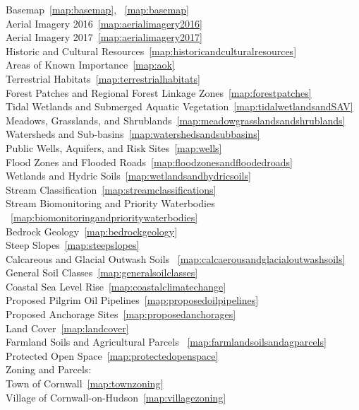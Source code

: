 Basemap\dotfill~\ref{map:basemap}, ~\ref{map:basemap}\\
Aerial Imagery 2016\dotfill~\ref{map:aerialimagery2016}\\
Aerial Imagery 2017\dotfill~\ref{map:aerialimagery2017}\\
Historic and Cultural Resources\dotfill~\ref{map:historicandculturalresources}\\
Areas of Known Importance\dotfill~\ref{map:aok}\\
Terrestrial Habitats\dotfill~\ref{map:terrestrialhabitats}\\
Forest Patches and Regional Forest Linkage Zones\dotfill~\ref{map:forestpatches} \\
Tidal Wetlands and Submerged Aquatic Vegetation\dotfill~\ref{map:tidalwetlandsandSAV}\\
Meadows, Grasslands, and Shrublands\dotfill~\ref{map:meadowgrasslandsandshrublands}\\
Watersheds and Sub-basins\dotfill~\ref{map:watershedsandsubbasins}\\
Public Wells, Aquifers, and Risk Sites\dotfill~\ref{map:wells}\\
Flood Zones and Flooded Roads\dotfill~\ref{map:floodzonesandfloodedroads}\\
Wetlands and Hydric Soils\dotfill~\ref{map:wetlandsandhydricsoils}\\
Stream Classification\dotfill~\ref{map:streamclassifications}\\
Stream Biomonitoring and Priority Waterbodies 
\dotfill~\ref{map:biomonitoringandprioritywaterbodies}\\
Bedrock Geology\dotfill~\ref{map:bedrockgeology}\\
Steep Slopes\dotfill~\ref{map:steepslopes}\\
Calcareous and Glacial Outwash Soils \dotfill ~\ref{map:calcaerousandglacialoutwashsoils}\\
General Soil Classes\dotfill~\ref{map:generalsoilclasses}\\
Coastal Sea Level Rise\dotfill~\ref{map:coastalclimatechange}\\
Proposed Pilgrim Oil Pipelines\dotfill~\ref{map:proposedoilpipelines}\\
Proposed Anchorage Sites\dotfill~\ref{map:proposedanchorages}\\
Land Cover\dotfill~\ref{map:landcover}\\
Farmland Soils and Agricultural Parcels \dotfill~\ref{map:farmlandsoilsandagparcels}\\
Protected Open Space\dotfill~\ref{map:protectedopenspace} \\
Zoning and Parcels:\\
Town of Cornwall\dotfill~\ref{map:townzoning}\\
Village of Cornwall-on-Hudson\dotfill~\ref{map:villagezoning}\\
